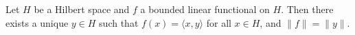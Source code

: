 Let $H$ be a Hilbert space and $f$ a bounded linear functional on $H$. Then there exists a unique $y \in H$ such that $f(x) = \langle x, y \rangle$ for all $x \in H$, and $\|f\| = \|y\|$.
